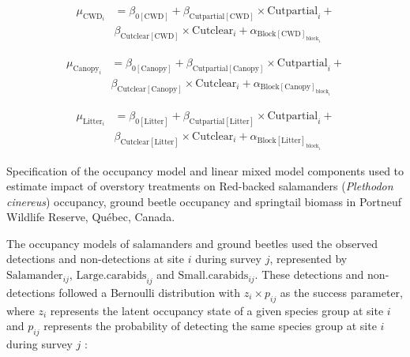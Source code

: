 \begin{align}
  \mu_{\text{CWD}_i} &= \beta_{0[\text{CWD}]} + \beta_{\text{Cutpartial}[\text{CWD}]} \times \text{Cutpartial}_{i} + \nonumber\\
  & \beta_{\text{Cutclear}[\text{CWD}]} \times \text{Cutclear}_{i} + \alpha_{\text{Block}[\text{CWD}]_{\text{block}_i}} 
\end{align}

\begin{align}
  \mu_{\text{Canopy}_i} &= \beta_{0[\text{Canopy}]} + \beta_{\text{Cutpartial}[\text{Canopy}]} \times \text{Cutpartial}_{i} + \nonumber \\
  & \beta_{\text{Cutclear}[\text{Canopy}]} \times \text{Cutclear}_{i} + \alpha_{\text{Block}[\text{Canopy}]_{\text{block}_i}} \nonumber
\end{align}

\begin{align}
  \mu_{\text{Litter}_i} &= \beta_{0[\text{Litter}]} + \beta_{\text{Cutpartial}[\text{Litter}]} \times \text{Cutpartial}_{i} + \nonumber\\
  & \beta_{\text{Cutclear}[\text{Litter}]} \times \text{Cutclear}_{i} + \alpha_{\text{Block}[\text{Litter}]_{\text{block}_i}} \nonumber
\end{align}

\vspace{10pt}

\begin{table}[h!]
   \caption[Specification of the occupancy model and linear mixed model components used to estimate impact of overstory treatments on Red-backed salamanders (\textit{Plethodon cinereus}) occupancy, ground beetle occupancy and springtail biomass.]
   {Specification of the occupancy model and linear mixed model components used to estimate impact of overstory treatments on Red-backed salamanders (\textit{Plethodon cinereus}) occupancy, ground beetle occupancy and springtail biomass in Portneuf Wildlife Reserve, Québec, Canada.}
   \label{ann:SEM_Sp_eq}
   \end{table}

The occupancy models of salamanders and ground beetles used the observed detections and non-detections at site $i$ during survey $j$, 
represented by $\text{Salamander}_{ij}$, $\text{Large.carabids}_{ij}$ and $\text{Small.carabids}_{ij}$. These detections and non-detections followed a Bernoulli distribution with $z_{i} \times p_{ij}$ as the success parameter, 
where $z_{i}$ represents the latent occupancy state of a given species group at site $i$ and $p_{ij}$ represents the probability of detecting the same species group at site $i$ during survey $j$ :



